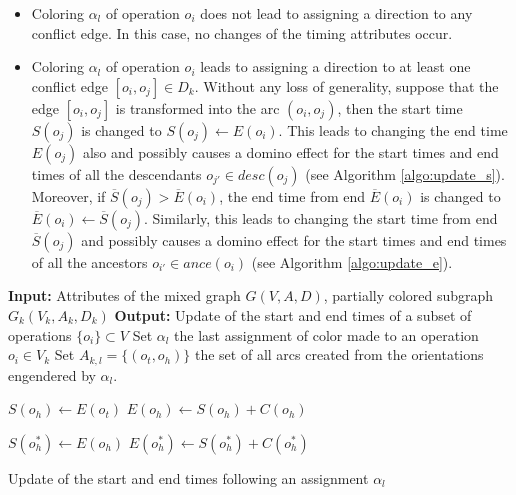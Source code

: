 \begin{itemize}
\item Coloring $\alpha_l$ of operation $o_i$ does not lead to assigning a direction to any conflict edge. In this case, no changes of the timing attributes occur.
\item Coloring $\alpha_l$ of operation $o_i$ leads to assigning a direction to at least one conflict edge $[o_i,o_j] \in D_k$. Without any loss of generality, suppose that the edge $[o_i,o_j]$ is transformed into the arc $(o_i,o_j)$, then the start time $S(o_j)$ is changed to $S(o_j) \leftarrow E(o_i)$. This leads to changing the end time $E(o_j)$ also and possibly causes a domino effect for the start times and end times of all the descendants $o_{j'} \in desc(o_j)$ (see Algorithm \ref{algo:update_s}). Moreover, if $\overline{S}(o_j) > \overline{E}(o_i)$, the end time from end $\overline{E}(o_i)$ is changed to $\overline{E}(o_i) \leftarrow \overline{S}(o_j)$. Similarly, this leads to changing the start time from end $\overline{S}(o_j)$ and possibly causes a domino effect for the start times and end times of all the ancestors $o_{i'} \in ance(o_i)$ (see Algorithm \ref{algo:update_e}).
\end{itemize}

\begin{algorithm}[htb]
	\textbf{Input:} Attributes of the mixed graph $G(V,A,D)$, partially colored subgraph $G_k(V_k,A_k,D_k)$\;
	\textbf{Output:} Update of the start and end times of a subset of operations $\{o_i\} \subset V$\;
	Set $\alpha_l$ the last assignment of color made to an operation $o_i \in V_k$\;
	Set $A_{k,l} = \{(o_t,o_h)\}$ the set of all arcs created from the orientations engendered by $\alpha_l$.
		{
				{
					$S(o_h) \leftarrow E(o_t)$\;
					$E(o_h) \leftarrow S(o_h) + C(o_h)$\;
					
				}
		}
		{
			{
						{
							{
								$S(o_h^*) \leftarrow E(o_h)$\;
								$E(o_h^*) \leftarrow S(o_h^*) + C(o_h^*)$\;
								\;
							}
						}
			}
			 \KwRet\;
		}
	\caption{Update of the start and end times following an assignment $\alpha_l$}
	\label{algo:update_s}
\end{algorithm}


